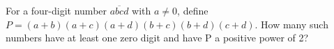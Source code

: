 For a four-digit number $\overline{abcd}$ with $a\ne 0$, define $P=(a+b)(a+c)(a+d)(b+c)(b+d)(c+d)$. How many such numbers have at least one zero digit and have P a positive power of 2?
